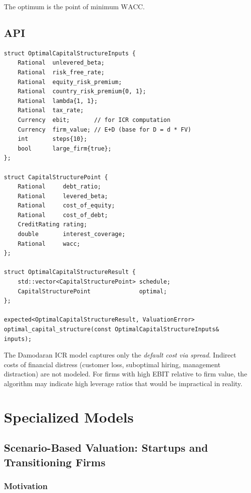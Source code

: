 \documentclass[12pt, a4paper, oneside]{book}
\newcommand{\WACC}{\ensuremath{\mathrm{WACC}}}
\begin{document}
The optimum is the point of minimum $\WACC$.

\section{API}

\begin{lstlisting}[style=cpp]
struct OptimalCapitalStructureInputs {
    Rational  unlevered_beta;
    Rational  risk_free_rate;
    Rational  equity_risk_premium;
    Rational  country_risk_premium{0, 1};
    Rational  lambda{1, 1};
    Rational  tax_rate;
    Currency  ebit;       // for ICR computation
    Currency  firm_value; // E+D (base for D = d * FV)
    int       steps{10};
    bool      large_firm{true};
};

struct CapitalStructurePoint {
    Rational     debt_ratio;
    Rational     levered_beta;
    Rational     cost_of_equity;
    Rational     cost_of_debt;
    CreditRating rating;
    double       interest_coverage;
    Rational     wacc;
};

struct OptimalCapitalStructureResult {
    std::vector<CapitalStructurePoint> schedule;
    CapitalStructurePoint              optimal;
};

expected<OptimalCapitalStructureResult, ValuationError>
optimal_capital_structure(const OptimalCapitalStructureInputs& inputs);
\end{lstlisting}

\begin{warning}
The Damodaran ICR model captures only the \emph{default cost via spread}.
Indirect costs of financial distress (customer loss, suboptimal hiring,
management distraction) are not modeled. For firms with high EBIT relative
to firm value, the algorithm may indicate high leverage ratios that would be
impractical in reality.
\end{warning}

\chapter{Specialized Models}

\section{Scenario-Based Valuation: Startups and Transitioning Firms}

\subsection{Motivation}
\end{document}
